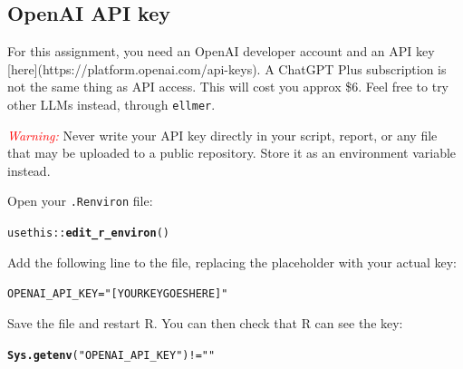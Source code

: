 \documentclass[11pt,a4paper,english]{article}\usepackage[]{graphicx}\usepackage[]{xcolor}
\makeatletter
\newcommand{\hlsng}[1]{\textcolor[rgb]{0.192,0.494,0.8}{#1}}%
\newcommand{\hlopt}[1]{\textcolor[rgb]{0,0,0}{#1}}%
\newcommand{\hldef}[1]{\textcolor[rgb]{0.345,0.345,0.345}{#1}}%
\newcommand{\hlkwb}[1]{\textcolor[rgb]{0.69,0.353,0.396}{#1}}%
\newcommand{\hlkwd}[1]{\textcolor[rgb]{0.737,0.353,0.396}{\textbf{#1}}}%
\newenvironment{kframe}{%
 \def\at@end@of@kframe{}%
 \ifinner\ifhmode%
  \def\at@end@of@kframe{\end{minipage}}%
  \begin{minipage}{\columnwidth}%
 \fi\fi%
 \def\FrameCommand##1{\hskip\@totalleftmargin \hskip-\fboxsep
 \colorbox{shadecolor}{##1}\hskip-\fboxsep
     \hskip-\linewidth \hskip-\@totalleftmargin \hskip\columnwidth}%
 \MakeFramed {\advance\hsize-\width
   \@totalleftmargin\z@ \linewidth\hsize
   \@setminipage}}%
 {\par\unskip\endMakeFramed%
 \at@end@of@kframe}
\newenvironment{knitrout}{}{} %
\makeatother
\begin{document}
\subsection{OpenAI API key}

For this assignment, you need an OpenAI developer account and an API key [here](https://platform.openai.com/api-keys). A ChatGPT Plus subscription is not the same thing as API access. This will cost you approx \$6. Feel free to try other LLMs instead, through \texttt{ellmer}.

\textcolor{red}{\emph{Warning:}} Never write your API key directly in your script, report, or any file that may be uploaded to a public repository. Store it as an environment variable instead.

Open your \texttt{.Renviron} file:

\begin{knitrout}\small
{}\color{fgcolor}\begin{kframe}
\begin{alltt}
\hldef{usethis}\hlopt{::}\hlkwd{edit_r_environ}\hldef{()}
\end{alltt}
\end{kframe}
\end{knitrout}

Add the following line to the file, replacing the placeholder with your actual key:

\begin{knitrout}\small
{}\color{fgcolor}\begin{kframe}
\begin{alltt}
\hldef{OPENAI_API_KEY}\hlkwb{=}\hlsng{"[YOUR KEY GOES HERE]"}
\end{alltt}
\end{kframe}
\end{knitrout}

Save the file and restart R. You can then check that R can see the key:

\begin{knitrout}\small
{}\color{fgcolor}\begin{kframe}
\begin{alltt}
\hlkwd{Sys.getenv}\hldef{(}\hlsng{"OPENAI_API_KEY"}\hldef{)} \hlopt{!=} \hlsng{""}
\end{alltt}
\end{kframe}
\end{knitrout}
\end{document}
